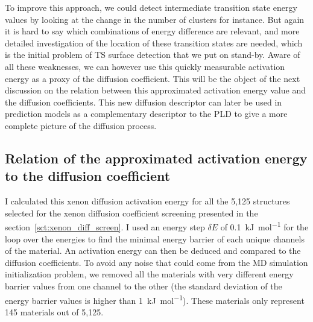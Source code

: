 \documentclass[main]{subfiles}
\begin{document}
To improve this approach, we could detect intermediate transition state energy values by looking at the change in the number of clusters for instance. But again it is hard to say which combinations of energy difference are relevant, and more detailed investigation of the location of these transition states are needed, which is the initial problem of TS surface detection that we put on stand-by. Aware of all these weaknesses, we can however use this quickly measurable activation energy as a proxy of the diffusion coefficient. 
This will be the object of the next discussion on the relation between this approximated activation energy value and the diffusion coefficients. This new diffusion descriptor can later be used in prediction models as a complementary descriptor to the PLD to give a more complete picture of the diffusion process. 

\subsection{Relation of the approximated activation energy to the diffusion coefficient}

I calculated this xenon diffusion activation energy for all the 5,125 structures selected for the xenon diffusion coefficient screening presented in the section~\ref{sct:xenon_diff_screen}. I used an energy step $\delta E$ of \SI{0.1}{\kJ\per\mol} for the loop over the energies to find the minimal energy barrier of each unique channels of the material. An activation energy can then be deduced and compared to the diffusion coefficients. To avoid any noise that could come from the MD simulation initialization problem, we removed all the materials with very different energy barrier values from one channel to the other (the standard deviation of the energy barrier values is higher than \SI{1}{\kJ\per\mol}). These materials only represent 145 materials out of 5,125.
\end{document}
